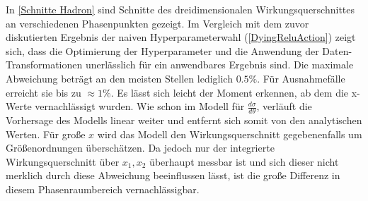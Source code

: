 In \textsf{\autoref{Schnitte Hadron}} sind Schnitte des dreidimensionalen Wirkungsquerschnittes an verschiedenen Phasenpunkten gezeigt. Im Vergleich mit dem zuvor diskutierten Ergebnis der naiven Hyperparameterwahl (\textsf{\autoref{DyingReluAction}}) zeigt sich, dass die Optimierung der Hyperparameter und die Anwendung der Daten-Transformationen unerlässlich für ein anwendbares Ergebnis sind. Die maximale Abweichung beträgt an den meisten Stellen lediglich $0.5\%$. Für Ausnahmefälle erreicht sie bis zu $\approx 1\%$. Es lässt sich leicht der Moment erkennen, ab dem die x-Werte vernachlässigt wurden. Wie schon im Modell für $\frac{d\sigma}{d\theta}$, verläuft die Vorhersage des Modells linear weiter und entfernt sich somit von den analytischen Werten. Für große $x$ wird das Modell den Wirkungsquerschnitt gegebenenfalls um Größenordnungen überschätzen. Da jedoch nur der integrierte Wirkungsquerschnitt über $x_1, x_2$ überhaupt messbar ist und sich dieser nicht merklich durch diese Abweichung beeinflussen lässt, ist die große Differenz in diesem Phasenraumbereich vernachlässigbar. 
